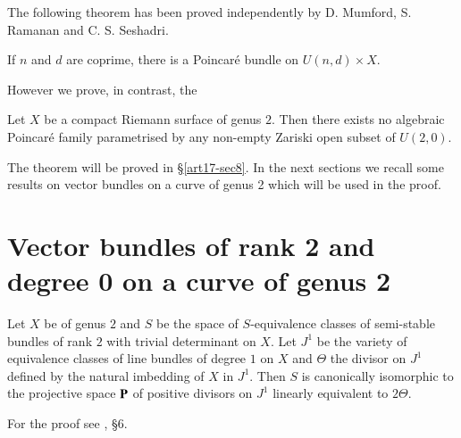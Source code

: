 The following theorem has been proved independently by D. Mumford, S. Ramanan and C. S. Seshadri.

\begin{theorem*}
If $n$ and $d$ are coprime, there is a Poincar\'e bundle on $U(n,d)\times X$.
\end{theorem*}

However we prove, in contrast, the 

\begin{maintheorem*}
Let $X$ be a compact Riemann surface of genus $2$. Then there exists no algebraic Poincar\'e family parametrised by any non-empty Zariski open subset of $U(2,0)$.
\end{maintheorem*}

The theorem will be proved in \S\ref{art17-sec8}. In the next sections we recall some results on vector bundles on a curve of genus 2 which will be used in the proof.

\section{Vector bundles of rank 2 and degree 0 on a curve of genus 2}\label{art17-sec4}

\begin{theorem}\label{art17-thm4.1}
Let $X$ be of genus $2$ and $S$ be the space of $S$-equivalence classes of semi-stable bundles of rank $2$ with trivial determinant on $X$. Let $J^{1}$ be the variety of equivalence classes of line bundles of degree $1$ on $X$ and $\Theta$ the divisor on $J^{1}$ defined by the natural imbedding of $X$ in $J^{1}$. Then $S$ is canonically isomorphic to the projective space $\mathbf{P}$ of positive divisors on $J^{1}$ linearly equivalent to $2\Theta$.
\end{theorem}

For the proof see \cite{art17-key3}, \S6.

